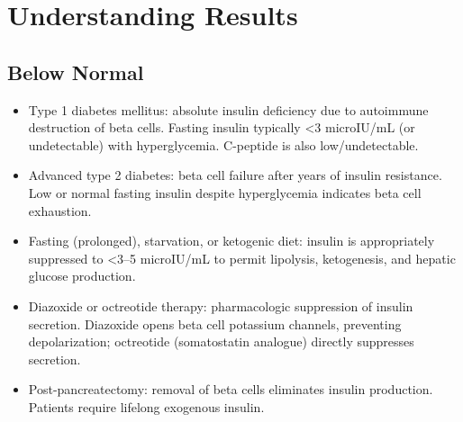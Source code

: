 \section*{Understanding Results}

\subsection*{Below Normal}
\begin{itemize}
  \item Type 1 diabetes mellitus: absolute insulin deficiency due to autoimmune destruction of beta cells. Fasting insulin typically <3 microIU/mL (or undetectable) with hyperglycemia. C-peptide is also low/undetectable.
  \item Advanced type 2 diabetes: beta cell failure after years of insulin resistance. Low or normal fasting insulin despite hyperglycemia indicates beta cell exhaustion.
  \item Fasting (prolonged), starvation, or ketogenic diet: insulin is appropriately suppressed to <3--5 microIU/mL to permit lipolysis, ketogenesis, and hepatic glucose production.
  \item Diazoxide or octreotide therapy: pharmacologic suppression of insulin secretion. Diazoxide opens beta cell potassium channels, preventing depolarization; octreotide (somatostatin analogue) directly suppresses secretion.
  \item Post-pancreatectomy: removal of beta cells eliminates insulin production. Patients require lifelong exogenous insulin.
\end{itemize}


